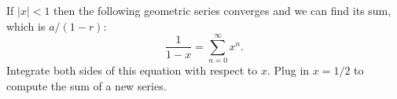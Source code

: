 If $|x|<1$ then the following geometric series converges and we can find its sum, which is $a/(1-r)$:
    $$\frac{1}{1-x} = \sum_{n=0}^\infty x^n.$$
Integrate both sides of this equation with respect to $x$.  Plug in $x=1/2$ to compute the sum of a new series.